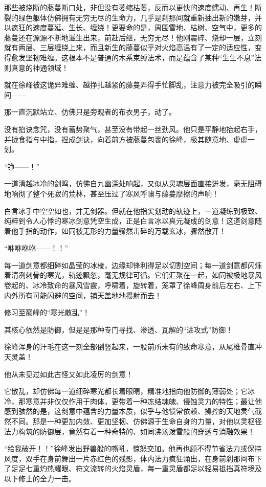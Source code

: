 那些被烧断的藤蔓断口处，非但没有萎缩枯萎，反而以更快的速度蠕动、再生！断裂的绿色躯体仿佛拥有无穷无尽的生命力，几乎是刹那间就重新抽出新的嫩芽，并以疯狂的速度蔓延、生长、缠绕！更要命的是，周围雪地、枯树、空气中，更多的藤蔓还在源源不断地滋生出来，前赴后继，无穷无尽！他刚震碎、烧却一层，立刻就有两层、三层缠绕上来，而且新生的藤蔓似乎对火焰高温有了一定的适应性，变得愈发坚韧难缠。这根本不是普通的木系束缚法术，而是蕴含了某种“生生不息”法则真意的神通领域！

就在徐峰被这诡异难缠、越挣扎越紧的藤蔓弄得手忙脚乱，注意力被完全吸引的瞬间——

那一直沉默站立、仿佛只是旁观者的布衣男子，动了。

没有掐诀念咒，没有蓄势聚气，甚至没有带起一丝劲风。他只是平静地抬起右手，并拢食指与中指，捏成剑诀，向着前方被藤蔓包裹的徐峰，极其随意地、虚虚一划。

“铮——！”

一道清越冰冷的剑鸣，仿佛自九幽深处响起，又似从灵魂层面直接迸发，毫无阻碍地响彻了整个死寂的荒林，甚至压过了寒风呼啸与藤蔓摩擦的声响！

白言冰手中空空如也，并无剑器。但就在他指尖划动的轨迹上，一道凝练到极致、纯粹到令人心悸的寒冰剑意凭空生成，正是白言冰以真元凝成的剑意！这道剑意随着他手指的动作，如同被无形的力量骤然击碎的万载玄冰，骤然散开！

“咻咻咻咻——！！”

每一道剑意都细碎如晶莹的冰棱，边缘却锋利得足以切割空间；每一道剑意都闪烁着清冽刺骨的寒光，轨迹飘忽，毫无规律可循。它们汇聚在一起，如同被极地暴风卷起的、冰冷致命的暴风雪霰，呼啸着，旋转着，笼罩了徐峰周身前后左右、上下内外所有可能闪避的空间，铺天盖地地攒射而去！

修习至巅峰的“寒光散乱”！

其核心依然是防御，但是是那种专门寻找、渗透、瓦解的“进攻式”防御！

徐峰浑身的汗毛在这一刻全部倒竖起来，一股前所未有的致命寒意，从尾椎骨直冲天灵盖！

他从未见过如此古怪又如此凌厉的剑意！

它散乱，却仿佛每一道细碎寒光都长着眼睛，精准地指向他防御的薄弱处；它冰冷，那寒意并非仅仅作用于肉体，更带着一种冻结魂魄、侵蚀灵力的特性；最让他感到骇然的是，这剑意中蕴含的力量本质，似乎与他惯常依赖、操控的天地灵气截然不同。那是一种更加内敛、更加坚韧、仿佛源于生命自身的力量，对他以灵枢径法力构筑的防御层，竟然有着一种奇特的、如同沸汤泼雪般的穿透与消融效果！

“给我破开！！”徐峰发出野兽般的嘶吼，惊怒交加。他再也顾不得节省法力或保持风度，双手在身前舞出一片赤红色的残影，体内法力疯狂涌出，在身前刹那间布下了足足七重灼热耀眼、符文流转的火焰灵盾，每一重灵盾都足以轻易抵挡真符境及以下修士的全力一击。

